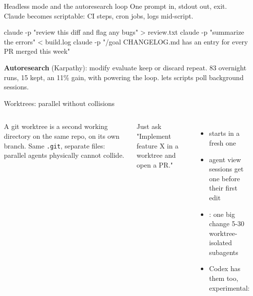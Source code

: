 \documentclass[aspectratio=169,11pt,t]{beamer}
\begin{document}
\begin{frame}[fragile]{Headless mode and the autoresearch loop}
  \small One prompt in, stdout out, exit. Claude becomes scriptable: CI steps, cron jobs, logs mid-script.
\begin{code}
claude -p "review this diff and flag any bugs" > review.txt
claude -p "summarize the errors" < build.log
claude -p "/goal CHANGELOG.md has an entry for every PR merged this week"
\end{code}
  \textbf{Autoresearch} (Karpathy): modify \ra{} evaluate \ra{} keep or discard \ra{} repeat. 83 overnight runs, 15 kept, an 11\% gain, with  powering the loop.  lets scripts poll background sessions.
\end{frame}

\begin{frame}{Worktrees: parallel without collisions}
  \begin{columns}[T,onlytextwidth]
      A git worktree is a second working directory on the same repo, on its own branch. Same \texttt{.git}, separate files: parallel agents physically cannot collide.\par\vspace{0.5em}
      \begin{callout}[good]{Just ask}
        "Implement feature X in a worktree and open a PR."
      \end{callout}
      \par\vspace{0.35em}
      \begin{itemize}\small\setlength\itemsep{0.3em}
        \item {} starts in a fresh one
        \item agent view sessions get one before their first edit
        \item {}: one big change \ra{} 5-30 worktree-isolated subagents
        \item Codex has them too, experimental: 
      \end{itemize}
  \end{columns}
\end{frame}
\end{document}

